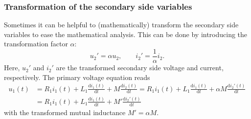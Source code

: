 \begin{frame}
	\frametitle{Transformation of the secondary side variables}
		Sometimes it can be helpful to (mathematically) transform the secondary side variables to ease the mathematical analysis. This can be done by introducing the transformation factor $\alpha$:
		\begin{equation}
			u_2' = \alpha u_2, \qquad i_2' = \frac{1}{\alpha} i_2.
		\end{equation}
		Here, $u_2'$ and $i_2'$ are the transformed secondary side voltage and current, respectively. The primary voltage equation reads
		\begin{equation}
			\begin{split}
			u_1(t) &= R_1 i_1(t) + L_1 \frac{\mathrm{d}i_1(t)}{\mathrm{d}t} + M \frac{\mathrm{d}i_2(t)}{\mathrm{d}t}  = R_1 i_1 (t)+ L_1 \frac{\mathrm{d}i_1(t)}{\mathrm{d}t}  + \alpha M \frac{\mathrm{d}i_2'(t)}{\mathrm{d}t}  \\&= R_1 i_1(t) + L_1 \frac{\mathrm{d}i_1(t)}{\mathrm{d}t} + M' \frac{\mathrm{d}i_2'(t)}{\mathrm{d}t}
		\end{split}
		\end{equation}
		with the transformed mutual inductance $M' = \alpha M$. 
\end{frame}

